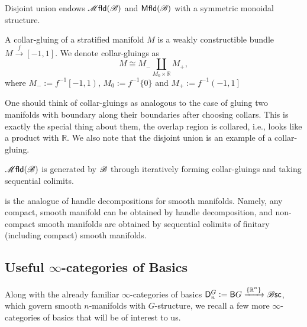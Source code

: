 \documentclass[../text]{subfiles}
\begin{document}
\begin{proposition}
    Disjoint union endows $\mfld(\bstr)$ and $\mfld[r](\bstr)$ with a symmetric monoidal structure.
\end{proposition}

\begin{definition}\label{def:collar-gluing}
    A collar-gluing of a stratified manifold $M$ is a weakly constructible bundle $M \xrightarrow{f} [-1,1]$. We denote collar-gluings as
    \begin{equation}
        M \cong M_- \coprod_{M_0 \times \mathbb{R}} M_+,
    \end{equation}
    where $M_- := f^{-1}\left[ -1, 1 \right)$, $M_0 := f^{-1}\{0\}$ and $M_+ := f^{-1} \left( -1, 1 \right]$
\end{definition}

\begin{remark}
    One should think of collar-gluings as analogous to the case of gluing two manifolds with boundary along their boundaries after choosing collars. This is exactly the special thing about them, the overlap region is collared, i.e., looks like a product with $\mathbb{R}$. We also note that the disjoint union is an example of a collar-gluing.
\end{remark}

\begin{theorem}\label{thm:decom_strat_man}
    $\mfld(\bstr)$ is generated by $\mathscr{B}$ through iteratively forming collar-gluings and taking sequential colimits.
\end{theorem}

\begin{remark}
     is the analogue of handle decompositions for smooth manifolds. Namely, any compact, smooth manifold can be obtained by handle decomposition, and non-compact smooth manifolds are obtained by sequential colimits of finitary (including compact) smooth manifolds.
\end{remark}




\subsection{Useful \texorpdfstring{$\infty$}{infinite}-categories of Basics}

Along with the already familiar $\infty$-categories of basics $\mathsf{D}_n^{G} := \mathsf{B}G \xrightarrow{\{ \mathbb{R}^n\}} \mathscr{B} \mathsf{sc}$, which govern smooth $n$-manifolds with $G$-structure, we recall a few more $\infty$-categories of basics that will be of interest to us. 
\end{document}
